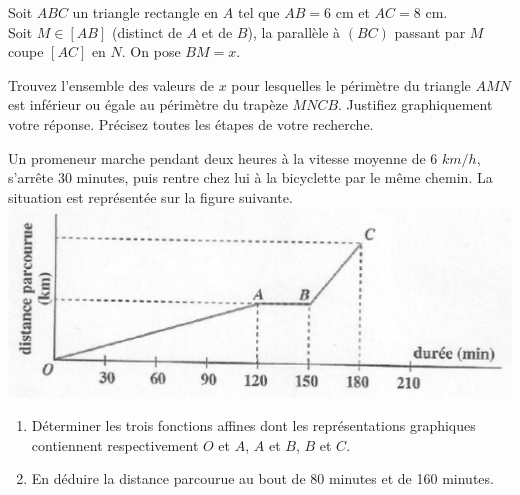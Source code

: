 \begin{exercice}
Soit $ABC$ un triangle rectangle en $A$ tel que $AB=6$ cm et $AC=8$ cm.\\ Soit $M\in[AB]$ (distinct de $A$ et de $B$), la parallèle à $(BC)$ passant par $M$ coupe $[AC]$ en $N$. On pose $BM=x$.

Trouvez l'ensemble des valeurs de $x$ pour lesquelles le périmètre du triangle $AMN$ est inférieur ou égale au périmètre du trapèze $MNCB$. Justifiez graphiquement votre réponse. Précisez toutes les étapes de votre recherche.
\end{exercice}

\begin{exercice}
Un promeneur marche pendant deux heures à la vitesse moyenne de 6 $km/h$, s'arrête 30 minutes, puis rentre chez lui à la bicyclette par le même chemin. La situation est représentée sur la figure suivante.
 \includegraphics[scale=0.4]{FonctionsAffines/figures/FA2.eps}
\begin{enumerate}
\item Déterminer les trois fonctions affines dont les représentations graphiques contiennent respectivement $O$ et $A$,  $A$ et $B$, $B$ et $C$.
\item En déduire la distance parcourue au bout de 80 minutes et de 160 minutes.
\end{enumerate}
\end{exercice}
